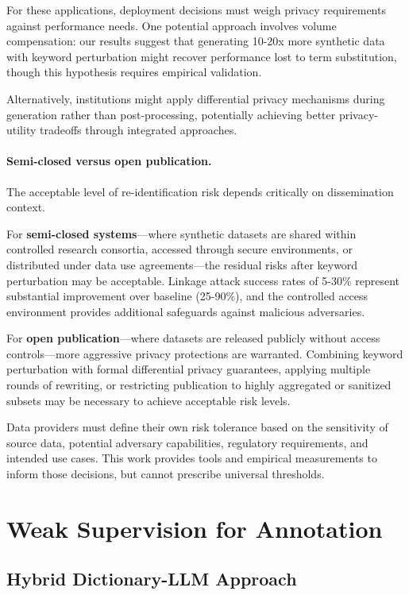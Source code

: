 For these applications, deployment decisions must weigh privacy requirements against performance needs.
One potential approach involves volume compensation: our results suggest that generating 10-20x more synthetic data with keyword perturbation might recover performance lost to term substitution, though this hypothesis requires empirical validation.

Alternatively, institutions might apply differential privacy mechanisms during generation rather than post-processing, potentially achieving better privacy-utility tradeoffs through integrated approaches.

\paragraph{Semi-closed versus open publication.}

The acceptable level of re-identification risk depends critically on dissemination context.

For \textbf{semi-closed systems}—where synthetic datasets are shared within controlled research consortia, accessed through secure environments, or distributed under data use agreements—the residual risks after keyword perturbation may be acceptable.
Linkage attack success rates of 5-30\% represent substantial improvement over baseline (25-90\%), and the controlled access environment provides additional safeguards against malicious adversaries.

For \textbf{open publication}—where datasets are released publicly without access controls—more aggressive privacy protections are warranted.
Combining keyword perturbation with formal differential privacy guarantees, applying multiple rounds of rewriting, or restricting publication to highly aggregated or sanitized subsets may be necessary to achieve acceptable risk levels.

Data providers must define their own risk tolerance based on the sensitivity of source data, potential adversary capabilities, regulatory requirements, and intended use cases.
This work provides tools and empirical measurements to inform those decisions, but cannot prescribe universal thresholds.


\section{Weak Supervision for Annotation}


\subsection{Hybrid Dictionary-LLM Approach}

